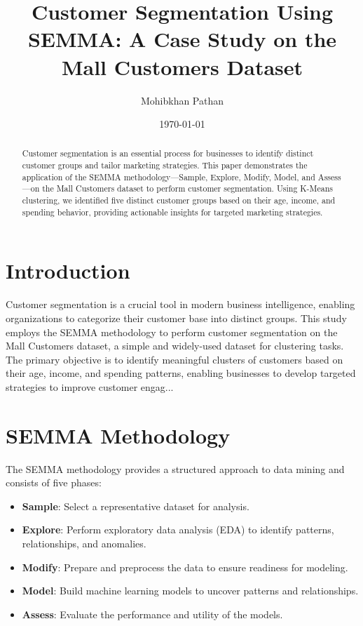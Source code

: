 \documentclass[12pt]{article}
\title{Customer Segmentation Using SEMMA: A Case Study on the Mall Customers Dataset}
\author{Mohibkhan Pathan}
\date{\today}
\begin{document}
\maketitle

\begin{abstract}
Customer segmentation is an essential process for businesses to identify distinct customer groups and tailor marketing strategies. This paper demonstrates the application of the SEMMA methodology—Sample, Explore, Modify, Model, and Assess—on the Mall Customers dataset to perform customer segmentation. Using K-Means clustering, we identified five distinct customer groups based on their age, income, and spending behavior, providing actionable insights for targeted marketing strategies.
\end{abstract}

\section{Introduction}
Customer segmentation is a crucial tool in modern business intelligence, enabling organizations to categorize their customer base into distinct groups. This study employs the SEMMA methodology to perform customer segmentation on the Mall Customers dataset, a simple and widely-used dataset for clustering tasks. The primary objective is to identify meaningful clusters of customers based on their age, income, and spending patterns, enabling businesses to develop targeted strategies to improve customer engag...

\section{SEMMA Methodology}
The SEMMA methodology provides a structured approach to data mining and consists of five phases:
\begin{itemize}
    \item \textbf{Sample}: Select a representative dataset for analysis.
    \item \textbf{Explore}: Perform exploratory data analysis (EDA) to identify patterns, relationships, and anomalies.
    \item \textbf{Modify}: Prepare and preprocess the data to ensure readiness for modeling.
    \item \textbf{Model}: Build machine learning models to uncover patterns and relationships.
    \item \textbf{Assess}: Evaluate the performance and utility of the models.
\end{itemize}
\end{document}
